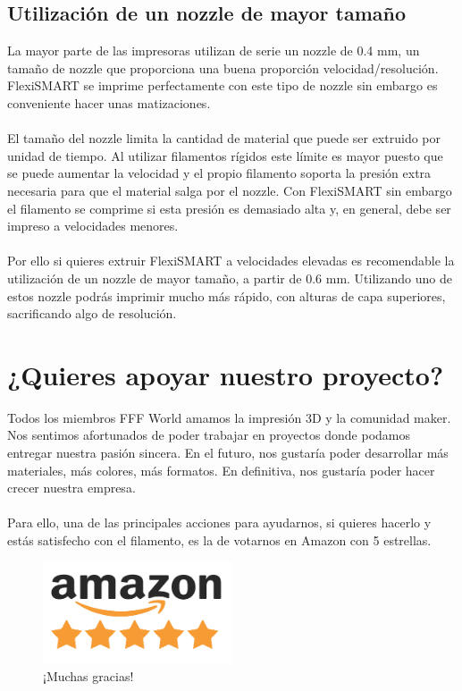 \documentclass[11pt,a4paper]{article}
\begin{document}
	\subsection{Utilización de un nozzle de mayor tamaño}
La mayor parte de las impresoras utilizan de serie un nozzle de 0.4 mm, un tamaño de nozzle que proporciona una buena proporción velocidad/resolución. FlexiSMART se imprime perfectamente con este tipo de nozzle sin embargo es conveniente hacer unas matizaciones.
\\\\
El tamaño del nozzle limita la cantidad de material que puede ser extruido por unidad de tiempo. Al utilizar filamentos rígidos este límite es mayor puesto que se puede aumentar la velocidad y el propio filamento soporta la presión extra necesaria para que el material salga por el nozzle. Con FlexiSMART sin embargo el filamento se comprime si esta presión es demasiado alta y, en general, debe ser impreso a velocidades menores.
\\\\
Por ello si quieres extruir FlexiSMART a velocidades elevadas es recomendable la utilización de un nozzle de mayor tamaño, a partir de 0.6 mm. Utilizando uno de estos nozzle podrás imprimir mucho más rápido, con alturas de capa superiores, sacrificando algo de resolución.
\section{¿Quieres apoyar nuestro proyecto?}
Todos los miembros FFF World amamos la impresión 3D y la comunidad maker. Nos sentimos afortunados de poder trabajar en proyectos donde podamos entregar nuestra pasión sincera. En el futuro, nos gustaría poder desarrollar más materiales, más colores, más formatos. En definitiva, nos gustaría poder hacer crecer nuestra empresa.
\\\\
Para ello, una de las principales acciones para ayudarnos, si quieres hacerlo y estás satisfecho con el filamento, es la de votarnos en Amazon con 5 estrellas.
\begin{figure}[H]
\centering
\includegraphics[width=0.5\textwidth,cfbox=azul_marcos 1pt 0pt]{FOTOS/AMAZON_FIVE_STARS}
\caption*{¡Muchas gracias!}
\end{figure}
\end{document}
